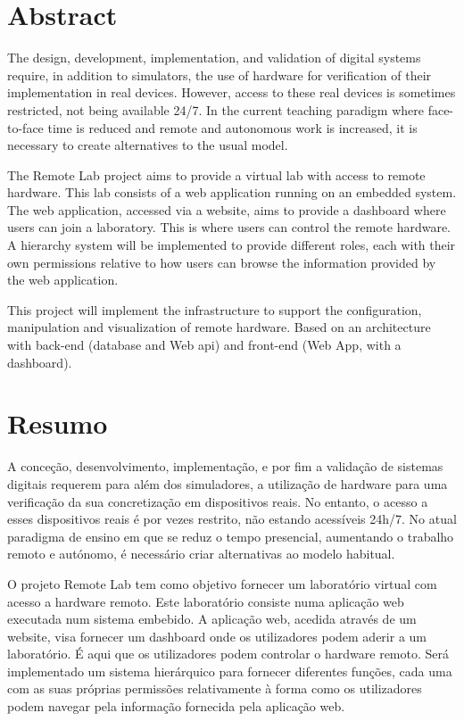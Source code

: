 \documentclass[report,a4paper,openright,twoside,11pt]{report}
\begin{document}
\cleardoublepage
\chapter*{Abstract}
The design, development, implementation, and validation of digital systems require, in addition 
to simulators, the use of hardware for verification of their implementation in real devices. 
However, access to these real devices is sometimes restricted, not being available 24/7. 
In the current teaching paradigm where face-to-face time is reduced and remote and autonomous work 
is increased, it is necessary to create alternatives to the usual model.

The Remote Lab project aims to provide a virtual lab with access to remote hardware.
This lab consists of a web application running on an embedded system. The web application, accessed via a website, 
aims to provide a dashboard where users can join a laboratory. This
is where users can control the remote hardware. A hierarchy system will be implemented to
provide different roles, each with their own permissions relative to how users can browse the
information provided by the web application.

This project will implement the infrastructure to support the configuration, manipulation and visualization
of remote hardware. Based on an architecture with back-end (database and Web \acs{api}) and front-end (Web App, with a dashboard). 

\cleardoublepage
\chapter*{Resumo}
A conceção, desenvolvimento, implementação, e por fim a validação de sistemas digitais 
requerem para além dos simuladores, a utilização de hardware para uma verificação da sua 
concretização em dispositivos reais. No entanto, o acesso a esses dispositivos reais é por 
vezes restrito, não estando acessíveis 24h/7. No atual paradigma de ensino em que se reduz 
o tempo presencial, aumentando o trabalho remoto e autónomo, é necessário criar alternativas 
ao modelo habitual. 

O projeto Remote Lab tem como objetivo fornecer um laboratório virtual com acesso a hardware remoto.
Este laboratório consiste numa aplicação web executada num sistema embebido. A aplicação web, acedida 
através de um website, visa fornecer um dashboard onde os utilizadores podem aderir a um laboratório. 
É aqui que os utilizadores podem controlar o hardware remoto. Será implementado um sistema hierárquico para 
fornecer diferentes funções, cada uma com as suas próprias permissões relativamente à forma como os utilizadores 
podem navegar pela informação fornecida pela aplicação web.
\end{document}
